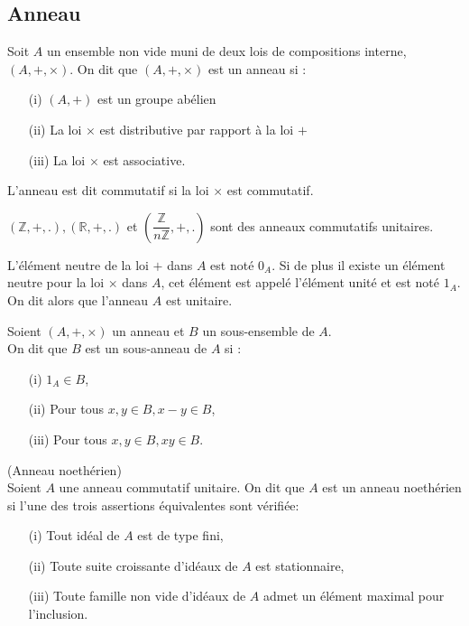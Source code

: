 \subsection{Anneau}
\begin{madefinition}
	Soit $A$ un ensemble non vide muni de deux lois de compositions interne, $(A, +, \times)$. On dit que $(A, +, \times)$ est un anneau si :
	\begin{enumerate}
		\item[(i)] $(A,+)$ est un groupe abélien
		\item[(ii)] La loi $\times$ est distributive par rapport à la loi $+$
		\item[(iii)] La loi $\times$ est associative.
	\end{enumerate}
	L'anneau est dit commutatif si la loi $\times$ est commutatif.
\end{madefinition}
\begin{monexemple}
	$(\mathbb{Z}, +, .), (\mathbb{R}, +, .)$ et $(\dfrac{\mathbb{Z}}{n\mathbb{Z}}, +,.)$ sont des anneaux commutatifs unitaires.
\end{monexemple}
\begin{maremarque}
	L'élément neutre de la loi $+$ dans $A$ est noté $0_A$. Si de plus il existe un élément neutre pour la loi $\times$ dans $A$, cet élément est appelé l'élément unité et est noté $1_A$. On dit alors que l'anneau $A$ est unitaire.
\end{maremarque}
\begin{madefinition}
	Soient $(A, + , \times)$ un anneau et $B$ un sous-ensemble de $A$.\\ On dit que $B$ est un sous-anneau de $A$ si :
	\begin{enumerate}
		\item[(i)] $1_A \in B$,
		\item[(ii)] Pour tous $x, y \in B, x-y \in B$,
		\item[(iii)] Pour tous $x, y \in B, xy \in B$.
	\end{enumerate}
\end{madefinition}
\begin{maproposition}
	(Anneau noethérien)\\
	Soient $A$ une anneau commutatif unitaire. On dit que $A$ est un anneau noethérien si l'une des trois assertions équivalentes sont vérifiée:
	\begin{enumerate}
		\item[(i)] Tout idéal de $A$ est de type fini,
		\item[(ii)] Toute suite croissante d'idéaux de $A$ est stationnaire,
		\item[(iii)] Toute famille non vide d'idéaux de $A$ admet un élément maximal pour l'inclusion.
	\end{enumerate} 
\end{maproposition}
